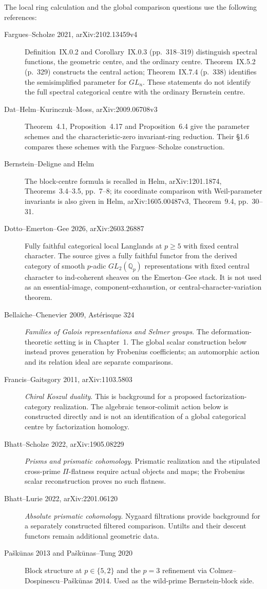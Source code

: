 The local ring calculation and the global comparison questions use the following references:
\begin{description}
\item[Fargues--Scholze 2021, arXiv:2102.13459v4]
Definition~IX.0.2 and Corollary~IX.0.3 (pp.~318--319) distinguish
spectral functions, the geometric centre, and the ordinary centre.
Theorem~IX.5.2 (p.~329) constructs the central action;
Theorem~IX.7.4 (p.~338) identifies the semisimplified parameter for
$GL_n$. These statements do not identify the full spectral
categorical centre with the ordinary Bernstein centre.
\item[Dat--Helm--Kurinczuk--Moss, arXiv:2009.06708v3]
Theorem~4.1, Proposition~4.17 and Proposition~6.4 give the parameter
schemes and the characteristic-zero invariant-ring reduction.
Their \S1.6 compares these schemes with the Fargues--Scholze construction.
\item[Bernstein--Deligne and Helm]
The block-centre formula is recalled in Helm, arXiv:1201.1874,
Theorems~3.4--3.5, pp.~7--8; its coordinate comparison with
Weil-parameter invariants is also given in Helm,
arXiv:1605.00487v3, Theorem~9.4, pp.~30--31.
\item[Dotto--Emerton--Gee 2026, arXiv:2603.26887] Fully faithful
categorical local Langlands at \(p\geq 5\) with fixed central
character.  The source gives a fully faithful functor from the
derived category of smooth \(p\)-adic \(GL_{2}(\mathbb Q_p)\)
representations with fixed central character to ind-coherent sheaves
on the Emerton--Gee stack.  It is not used as an essential-image,
component-exhaustion, or central-character-variation theorem.
\item[Bella\"iche--Chenevier 2009, Ast\'erisque 324]
\emph{Families of Galois representations and Selmer groups}.
The deformation-theoretic setting is in Chapter~1. The global scalar
construction below instead proves generation by Frobenius coefficients;
an automorphic action and its relation ideal are separate comparisons.
\item[Francis--Gaitsgory 2011, arXiv:1103.5803]
\emph{Chiral Koszul duality}. This is background for a proposed
factorization-category realization. The algebraic tensor-colimit action
below is constructed directly and is not an identification of a global
categorical centre by factorization homology.
\item[Bhatt--Scholze 2022, arXiv:1905.08229]
\emph{Prisms and prismatic cohomology}. Prismatic realization and the
stipulated cross-prime $\Pi$-flatness require actual objects and maps;
the Frobenius scalar reconstruction proves no such flatness.
\item[Bhatt--Lurie 2022, arXiv:2201.06120]
\emph{Absolute prismatic cohomology}. Nygaard filtrations provide
background for a separately constructed filtered comparison. Untilts
and their descent functors remain additional geometric data.
\item[Pa{\v s}k{\=u}nas 2013 and
Pa{\v s}k{\=u}nas--Tung 2020] Block structure at
\(p\in\{5,2\}\) and the \(p=3\) refinement via
Colmez--Dospinescu--Pa{\v s}k{\=u}nas 2014. Used as
the wild-prime Bernstein-block side.
\end{description}


